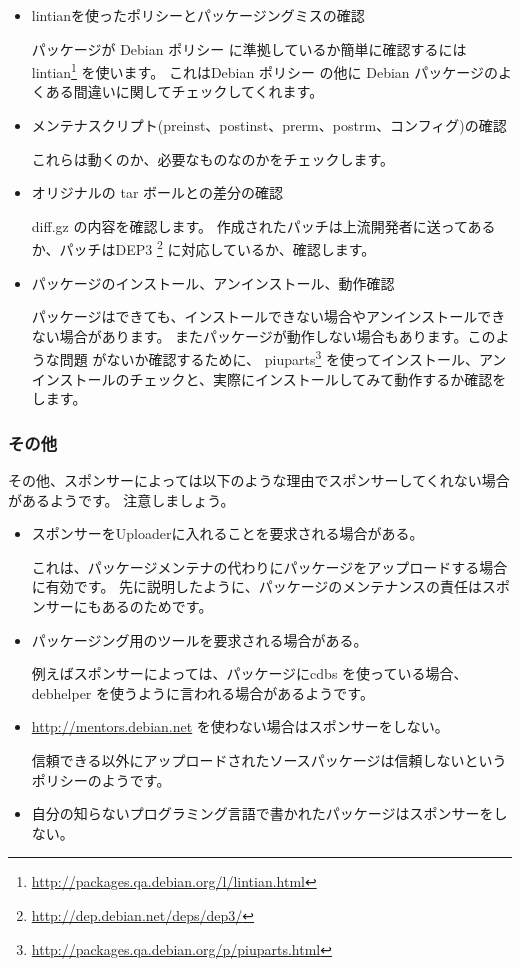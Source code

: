 \documentclass[mingoth,a4paper]{jsarticle}
\begin{document}
\begin{itemize}
\item lintianを使ったポリシーとパッケージングミスの確認

パッケージが Debian ポリシー に準拠しているか簡単に確認するには
lintian\footnote{\url{http://packages.qa.debian.org/l/lintian.html}} を使います。
これはDebian ポリシー の他に Debian パッケージのよくある間違いに関してチェックしてくれます。

\item メンテナスクリプト(preinst、postinst、prerm、postrm、コンフィグ)の確認

これらは動くのか、必要なものなのかをチェックします。

\item オリジナルの tar ボールとの差分の確認

diff.gz の内容を確認します。
作成されたパッチは上流開発者に送ってあるか、パッチはDEP3
\footnote{\url{http://dep.debian.net/deps/dep3/}}
に対応しているか、確認します。

\item パッケージのインストール、アンインストール、動作確認

パッケージはできても、インストールできない場合やアンインストールできない場合があります。
またパッケージが動作しない場合もあります。このような問題
がないか確認するために、
piuparts\footnote{\url{http://packages.qa.debian.org/p/piuparts.html}} を使ってインストール、アンインストールのチェックと、実際にインストールしてみて動作するか確認をします。

\end{itemize}

\subsubsection{その他}
その他、スポンサーによっては以下のような理由でスポンサーしてくれない場合があるようです。
注意しましょう。

\begin{itemize}

\item スポンサーをUploaderに入れることを要求される場合がある。

これは、パッケージメンテナの代わりにパッケージをアップロードする場合に有効です。
先に説明したように、パッケージのメンテナンスの責任はスポンサーにもあるのためです。

\item パッケージング用のツールを要求される場合がある。

例えばスポンサーによっては、パッケージにcdbs を使っている場合、debhelper を使うように言われる場合があるようです。

\item \url{http://mentors.debian.net} を使わない場合はスポンサーをしない。

信頼できる以外にアップロードされたソースパッケージは信頼しないというポリシーのようです。

\item 自分の知らないプログラミング言語で書かれたパッケージはスポンサーをしない。

\end{itemize}
\end{document}
